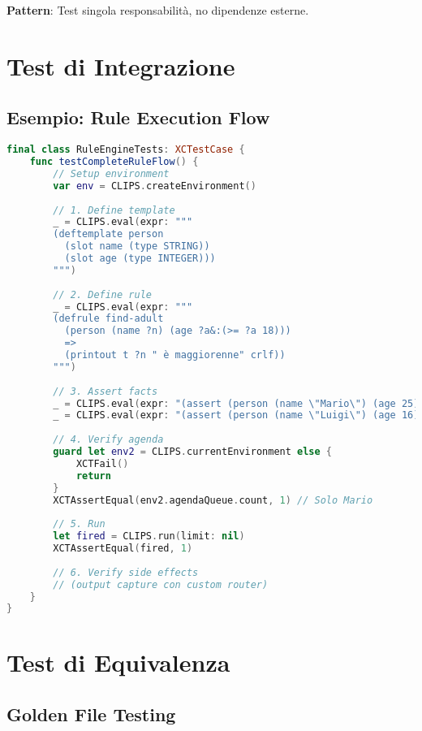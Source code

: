 \textbf{Pattern}: Test singola responsabilità, no dipendenze esterne.

\section{Test di Integrazione}

\subsection{Esempio: Rule Execution Flow}

\begin{lstlisting}[language=Swift]
final class RuleEngineTests: XCTestCase {
    func testCompleteRuleFlow() {
        // Setup environment
        var env = CLIPS.createEnvironment()
        
        // 1. Define template
        _ = CLIPS.eval(expr: """
        (deftemplate person
          (slot name (type STRING))
          (slot age (type INTEGER)))
        """)
        
        // 2. Define rule
        _ = CLIPS.eval(expr: """
        (defrule find-adult
          (person (name ?n) (age ?a&:(>= ?a 18)))
          =>
          (printout t ?n " è maggiorenne" crlf))
        """)
        
        // 3. Assert facts
        _ = CLIPS.eval(expr: "(assert (person (name \"Mario\") (age 25)))")
        _ = CLIPS.eval(expr: "(assert (person (name \"Luigi\") (age 16)))")
        
        // 4. Verify agenda
        guard let env2 = CLIPS.currentEnvironment else {
            XCTFail()
            return
        }
        XCTAssertEqual(env2.agendaQueue.count, 1) // Solo Mario
        
        // 5. Run
        let fired = CLIPS.run(limit: nil)
        XCTAssertEqual(fired, 1)
        
        // 6. Verify side effects
        // (output capture con custom router)
    }
}
\end{lstlisting}

\section{Test di Equivalenza}

\subsection{Golden File Testing}

